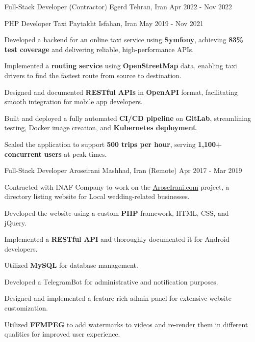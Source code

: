 \begin{cventries}
  \cventry
    {Full-Stack Developer (Contractor)} %
    {Egerd} %
    {Tehran, Iran} %
    {Apr 2022 - Nov 2022} %
    {}

  \cventry
    {PHP Developer} %
    {Taxi Paytakht} %
    {Isfahan, Iran} %
    {May 2019  - Nov 2021} %
    {
      \begin{cvitems}
        \item {Developed a backend for an online taxi service using \textbf{Symfony}, achieving \textbf{83\% test coverage} and delivering reliable, high-performance APIs.}
        \item {Implemented a \textbf{routing service} using \textbf{OpenStreetMap} data, enabling taxi drivers to find the fastest route from source to destination.}
        \item {Designed and documented \textbf{RESTful APIs} in \textbf{OpenAPI} format, facilitating smooth integration for mobile app developers.}
        \item {Built and deployed a fully automated \textbf{CI/CD pipeline} on \textbf{GitLab}, streamlining testing, Docker image creation, and \textbf{Kubernetes deployment}.}
        \item {Scaled the application to support \textbf{500 trips per hour}, serving \textbf{1,100+ concurrent users} at peak times.}
      \end{cvitems}
    }
  
  \cventry
    {Full-Stack Developer} %
    {Aroseirani} %
    {Mashhad, Iran (Remote)} %
    {Apr 2017 - Mar 2019} %
    {
      \begin{cvitems} %
        \item {Contracted with INAF Company to work on the \href{https://aroseirani.com}{\underline{AroseIrani.com}} project, a directory listing website for Local wedding-related businesses.}
        \item {Developed the website using a custom \textbf{PHP} framework, HTML, CSS, and jQuery.}
        \item {Implemented a \textbf{RESTful API} and thoroughly documented it for Android developers.}
        \item {Utilized \textbf{MySQL} for database management.}
        \item {Developed a TelegramBot for administrative and notification purposes.}
        \item {Designed and implemented a feature-rich admin panel for extensive website customization.}
        \item {Utilized \textbf{FFMPEG} to add watermarks to videos and re-render them in different qualities for improved user experience.}
      \end{cvitems}
    }


\end{cventries}
